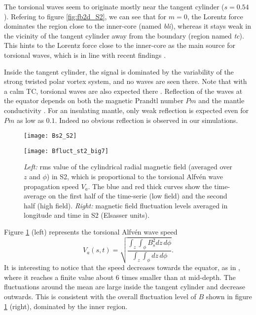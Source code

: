 \documentclass[12pt, a4paper]{article}
\begin{document}
The torsional waves seem to originate mostly near the tangent cylinder ($s=0.54$).
Refering to figure \ref{fig:fb2d_S2}, we can see that for $m=0$, the Lorentz force dominates the region close to the inner-core (named \textit{bli}), whereas it stays weak in the vicinity of the tangent cylinder away from the boundary (region named \textit{tc}).
This hints to the Lorentz force close to the inner-core as the main source for torsional waves, which is in line with recent findings \citep{teed2015}.

Inside the tangent cylinder, the signal is dominated by the variability of the strong twisted polar vortex system, and no waves are seen there.
Note that with a calm TC, torsional waves are also expected there \citep[as observed by][]{teed2015}.
Reflection of the waves at the equator depends on both the magnetic Prandtl number $Pm$ \citep{schaeffer2012} and the mantle conductivity \citep{schaeffer2016b}.
For an insulating mantle, only weak reflection is expected even for $Pm$ as low as $0.1$.
Indeed no obvious reflection is observed in our simulations.

\begin{figure}
\begin{center}
\begin{minipage}{0.6\textwidth}
\texttt{[image: Bs2\_S2]}
\end{minipage}
\begin{minipage}{0.39\textwidth}
\texttt{[image: Bfluct\_st2\_big7]}
\end{minipage}
\caption{\textit{Left:} rms value of the cylindrical radial magnetic field (averaged over $z$ and $\phi$) in S2, which is proportional to the torsional Alfvén wave propagation speed $V_a$.
The blue and red thick curves show the time-average on the first half of the time-serie (low field) and the second half (high field).
\textit{Right:} magnetic field fluctuation levels averaged in longitude and time in S2 (Elsasser units).
}
\label{fig:Bs2_S2}
\end{center}
\end{figure}

Figure \ref{fig:Bs2_S2} (left) represents the torsional Alfvén wave speed 
\begin{equation}
V_a(s,t) = \sqrt{\frac{ \int_z \int_\phi B_s^2 dz\,d\phi} {\int_z \int_\phi dz\,d\phi  }} .
\end{equation}
It is interesting to notice that the speed decreases towards the equator, as in \cite{gillet2011}, where it reaches a finite value about 6 times smaller than at mid-depth.
The fluctuations around the mean are large inside the tangent cylinder and decrease outwards.
This is consistent with the overall fluctuation level of $B$ shown in figure \ref{fig:Bs2_S2} (right), dominated by the inner region.
\end{document}
